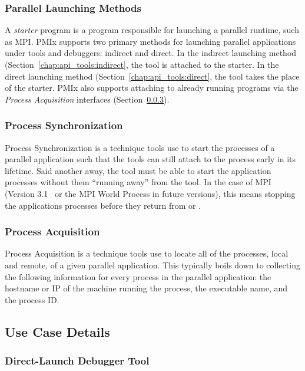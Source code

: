 \subsubsection{Parallel Launching Methods}

A \textit{starter} program is a program responsible for launching a parallel runtime, such as \ac{MPI}.  \ac{PMIx} supports two primary methods for launching parallel applications under tools and debuggers: indirect and direct. In the indirect launching method (Section~\ref{chap:api_tools:indirect}, the tool is attached to the starter.  In the direct launching method (Section~\ref{chap:api_tools:direct}, the tool takes the place of the starter.
\ac{PMIx} also supports attaching to already running programs via the \textit{Process Acquisition} interfaces (Section~\ref{subsubsec:process-acq}).

\subsubsection{Process Synchronization}

Process Synchronization is a technique tools use to start the processes of a parallel application such that the tools can still attach to the process early in its lifetime.  Said another away, the tool must be able to start the application processes without them ``running away'' from the tool.  In the case of \ac{MPI} (Version 3.1~\cite{mpi-3.1} or the MPI World Process in future versions), this means stopping the applications processes before they return from  or .

\subsubsection{Process Acquisition}\label{subsubsec:process-acq}

Process Acquisition is a technique tools use to locate all of the processes, local and remote, of a given parallel application.  This typically boils down to collecting the following information for every process in the parallel application: the hostname or IP of the machine running the process, the executable name, and the process ID.

\subsection{Use Case Details}
\subsubsection{Direct-Launch Debugger Tool}

